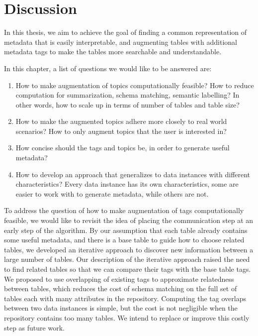 
\chapter{Discussion}
\label{ch:Discussions}

In this thesis, we aim to achieve the goal of finding a common representation of metadata that is easily interpretable, and augmenting tables with additional metadata tags to make the tables more searchable and understandable.

In this chapter, a list of questions we would like to be answered are:
\begin{enumerate}
\item How to make augmentation of topics computationally feasible? How to reduce computation for summarization, schema matching, semantic labelling? In other words, how to scale up in terms of number of tables and table size?
\item How to make the augmented topics adhere more closely to real world scenarios? How to only augment topics that the user is interested in?
\item How concise should the tags and topics be, in order to generate useful metadata?
\item How to develop an approach that generalizes to data instances with different characteristics? Every data instance has its own characteristics, some are easier to work with to generate metadata, while others are not.	
\end{enumerate}

To address the question of how to make augmentation of tags computationally feasible, we would like to revisit the idea of placing the communication step at an early step of the algorithm. By our assumption that each table already contains some useful metadata, and there is a base table to guide how to choose related tables, we developed an iterative approach to discover new information between a large number of tables. Our description of the iterative approach raised the need to find related tables so that we can compare their tags with the base table tags. We proposed to use overlapping of existing tags to approximate relatedness between tables, which reduces the cost of schema matching on the full set of tables each with many attributes in the repository. Computing the tag overlaps between two data instances is simple, but the cost is not negligible when the repository contains too many tables. We intend to replace or improve this costly step as future work.

